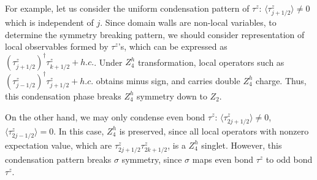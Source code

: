 \documentclass[reprint,amsmath,amssymb,aps,pra,]{revtex4-1}
\newcommand{\dg}{\dagger}
\begin{document}
For example, let us consider the uniform condensation pattern of $\tau^z$: $\langle\tau^z_{j+1/2}\rangle\neq0$ which is independent of $j$.
Since domain walls are non-local variables, to determine the symmetry breaking pattern, we should consider representation of local observables formed by $\tau^z$'s, which can be expressed as $(\tau^z_{j+1/2})^\dg\tau^z_{k+1/2}+h.c.$.
Under $Z_4^h$ transformation, local operators such as $(\tau^z_{j-1/2})^\dg\tau^z_{j+1/2}+h.c.$ obtains minus sign, and carries double $Z_4^h$ charge.
Thus, this condensation phase breaks $Z_4^h$ symmetry down to $Z_2$.

On the other hand, we may only condense even bond $\tau^z$: $\langle\tau^z_{2j+1/2}\rangle\neq 0$, $\langle\tau^z_{2j-1/2}\rangle=0$.
In this case, $Z_4^h$ is preserved, since all local operators with nonzero expectation value, which are $\tau^z_{2j+1/2}\tau^z_{2k+1/2}$, is a $Z_4^h$ singlet.
However, this condensation pattern breaks $\sigma$ symmetry, since $\sigma$ maps even bond $\tau^z$ to odd bond $\tau^z$.

%
\end{document}
